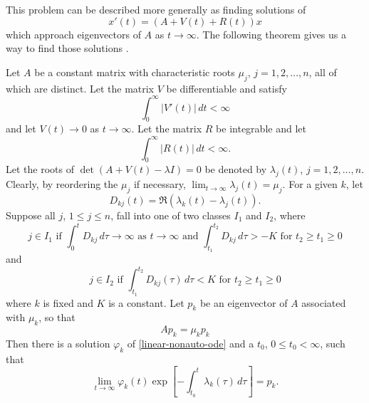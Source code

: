 This problem can be described more generally as finding solutions of 
\begin{equation}\label{linear-nonauto-ode}
	x'(t) = (A+ V(t) + R(t))x
\end{equation}
which approach eigenvectors of \(A\) as \(t\to \infty\). The following theorem gives us a way to find those solutions \cite[Chp.~3, Thm.~8.1]{coddington1955theory}.
\begin{theorem}\label{thm:coddington}
	Let \(A\) be a constant matrix with characteristic roots \(\mu_j\), \(j=1,2,\ldots, n\), all of which are distinct. Let the matrix \(V\) be differentiable and satisfy
	\begin{equation*}
		\int_0^\infty |V'(t)|\, dt < \infty
	\end{equation*}
	and let \(V(t) \to 0\) as \(t\to\infty\). Let the matrix \(R\) be integrable and let 
	\begin{equation*}
		\int_0^\infty |R(t)|\, dt < \infty.
	\end{equation*}
	Let the roots of \(\det(A+V(t) -\lambda I) = 0\) be denoted by \(\lambda_j(t)\), \(j = 1,2 ,\ldots, n\). Clearly, by reordering the \(\mu_j\) if necessary, \(\lim_{t\to\infty} \lambda_j(t) = \mu_j\). For a given \(k\), let 
	\begin{equation*}
		D_{kj}(t) = \Re(\lambda_k(t) - \lambda_j(t)).
	\end{equation*}
	Suppose all \(j\), \(1\leq j \leq n\), fall into one of two classes \(I_1\) and \(I_2\), where
	\begin{equation*}
		j \in I_1 \text{ if } \int_0^t D_{kj}\, d\tau \to \infty \text{ as } t\to\infty \text{ and } \int_{t_1}^{t_2} D_{kj}\, d\tau > -K \text{ for }t_2\geq t_1 \geq 0
	\end{equation*}
	and 
	\begin{equation*}
		j \in I_2 \text{ if } \int_{t_1}^{t_2} D_{kj}(\tau) \, d\tau  < K \text{ for } t_2\geq t_1\geq 0
	\end{equation*}
	where \(k\) is fixed and \(K\) is a constant. Let \(p_k\) be an eigenvector of \(A\) associated with \(\mu_k\), so that 
	\begin{equation*}
		Ap_k = \mu_k p_k
	\end{equation*}
	Then there is a solution \(\varphi_k\) of \cref{linear-nonauto-ode} and a \(t_0\), \(0\leq t_0< \infty\), such that
	\begin{equation*}
		\lim_{t\to\infty} \varphi_k(t) \exp\left[ - \int_{t_0}^ t \lambda_k(\tau) \, d\tau \right] = p_k.
	\end{equation*}
\end{theorem}

